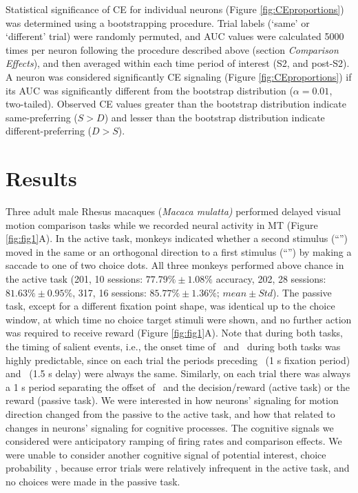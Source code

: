 Statistical significance of CE for individual neurons (Figure \ref{fig:CEproportions}) was determined using a bootstrapping procedure. Trial labels (`same' or `different' trial) were randomly permuted, and AUC values were calculated 5000 times per neuron following the procedure described above (section \textit{Comparison Effects}), and then averaged within each time period of interest (S2, and post-S2). A neuron was considered significantly CE signaling (Figure \ref{fig:CEproportions}) if its AUC was significantly different from the bootstrap distribution ($\alpha=0.01$, two-tailed). Observed CE values greater than the bootstrap distribution indicate same-preferring ($S>D$) and lesser than the bootstrap distribution indicate different-preferring ($D>S$).

\section*{\color{sectionBlue} Results}
Three adult male Rhesus macaques (\textit{Macaca mulatta)} performed delayed visual motion comparison tasks while we recorded neural activity in MT (Figure \ref{fig:fig1}A). 
In the active task, monkeys indicated whether a second stimulus (``\test'') moved in the same or an orthogonal direction to a first stimulus (``\sample'') by making a saccade to one of two choice dots. 
All three monkeys performed above chance in the active task (201, 10 sessions: $77.79\% \pm 1.08\%$ accuracy, 202, 28 sessions: $81.63\% \pm 0.95\%$, 317, 16 sessions: $85.77\% \pm 1.36\%$; $mean \pm Std$). 
The passive task, except for a different fixation point shape, was identical up to the choice window, at which time no choice target stimuli were shown, and no further action was required to receive reward (Figure \ref{fig:fig1}A). 
Note that during both tasks, the timing of salient events, i.e., the onset time of \sample\ and \test\ during both tasks was highly predictable, since on each trial the periods preceding \sample\ (1 s fixation period) and \test\ (1.5 s delay) were always the same. 
Similarly, on each trial there was always a 1 s period separating the offset of \test\ and the decision/reward (active task) or the reward (passive task).
We were interested in how neurons' signaling for motion direction changed from the passive to the active task, and how that related to changes in neurons' signaling for cognitive processes.
The cognitive signals we considered were anticipatory ramping of firing rates and comparison effects. We were unable to consider another cognitive signal of potential interest, choice probability \parencite{britten1996}, because error trials were relatively infrequent in the active task, and no choices were made in the passive task.



